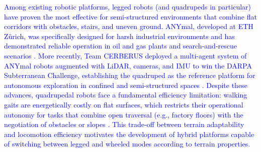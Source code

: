 \documentclass[preprint,12pt]{elsarticle}
\newcommand{\revblue}[1]{\textcolor{blue}{#1}}
\begin{document}
\revblue{Among existing robotic platforms, legged robots (and quadrupeds in particular) have proven the most effective for semi-structured environments that combine flat corridors with obstacles, stairs, and uneven ground. ANYmal, developed at ETH Z\"{u}rich, was specifically designed for harsh industrial environments and has demonstrated reliable operation in oil and gas plants and search-and-rescue scenarios \citep{Hutter2017ANYmal}. More recently, Team CERBERUS deployed a multi-agent system of ANYmal robots augmented with LiDAR, cameras, and IMU to win the DARPA Subterranean Challenge, establishing the quadruped as the reference platform for autonomous exploration in confined and semi-structured spaces \citep{Tranzatto2022CERBERUS}. Despite these advances, quadrupedal robots face a fundamental efficiency limitation: walking gaits are energetically costly on flat surfaces, which restricts their operational autonomy for tasks that combine open traversal (e.g., factory floors) with the negotiation of obstacles or slopes \citep{Vogel2024Ladder}. This trade-off between terrain adaptability and locomotion efficiency motivates the development of hybrid platforms capable of switching between legged and wheeled modes according to terrain properties.}
\end{document}
